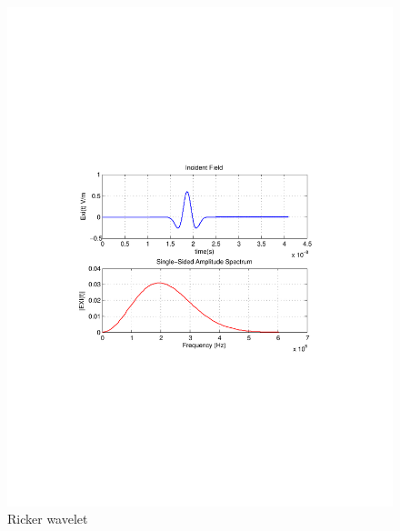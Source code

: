 \begin{figure}[H]
\centering
\includegraphics[scale=0.8, trim=3.5cm 8.7cm 4.5cm 8.85cm, clip]{Figures/FigCh03_IncidentFieldRicker.pdf}
\caption{Ricker wavelet}
\label{1DDNG-IncidentField-Ricker}
\end{figure}
